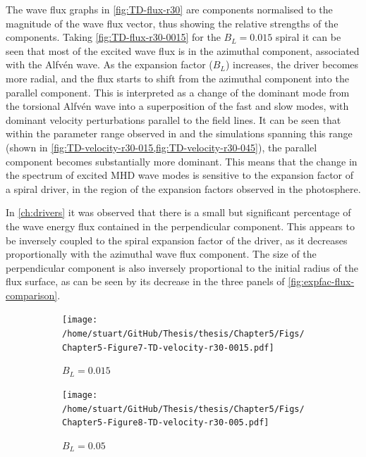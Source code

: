 \documentclass[a4paper,12pt,fourier,authoryear,custommargin]{Classes/PhDThesisPSnPDF}
\begin{document}
The wave flux graphs in \cref{fig:TD-flux-r30} are components normalised to the magnitude of the wave flux vector, thus showing the relative strengths of the components.
Taking \cref{fig:TD-flux-r30-0015} for the $B_L=0.015$ spiral it can be seen that most of the excited wave flux is in the azimuthal component, associated with the Alfv\'en wave.
As the expansion factor ($B_L$) increases, the driver becomes more radial, and the flux starts to shift from the azimuthal component into the parallel component.
This is interpreted as a change of the dominant mode from the torsional Alfv\'en wave into a superposition of the fast and slow modes, with dominant velocity perturbations parallel to the field lines.
It can be seen that within the parameter range observed in \cite{bonet2008} and the simulations spanning this range (shown in \cref{fig:TD-velocity-r30-015,fig:TD-velocity-r30-045}), the parallel component becomes substantially more dominant.
This means that the change in the spectrum of excited MHD wave modes is sensitive to the expansion factor of a spiral driver, in the region of the expansion factors observed in the photosphere.

In \cref{ch:drivers} it was observed that there is a small but significant percentage of the wave energy flux contained in the perpendicular component.
This appears to be inversely coupled to the spiral expansion factor of the driver, as it decreases proportionally with the azimuthal wave flux component.
The size of the perpendicular component is also inversely proportional to the initial radius of the flux surface, as can be seen by its decrease in the three panels of \cref{fig:expfac-flux-comparison}.



\begin{figure}
    \centering
    

    \begin{subfigure}[b]{0.9\columnwidth}
        \texttt{[image: /home/stuart/GitHub/Thesis/thesis/Chapter5/Figs/Chapter5-Figure7-TD-velocity-r30-0015.pdf]}
        \caption{$B_L = 0.015$}
        \label{fig:TD-velocity-r30-0015}
    \end{subfigure}

    \begin{subfigure}[b]{0.9\columnwidth}
        \texttt{[image: /home/stuart/GitHub/Thesis/thesis/Chapter5/Figs/Chapter5-Figure8-TD-velocity-r30-005.pdf]}
        \caption{$B_L = 0.05$}
        \label{fig:TD-velocity-r30-005}
    \end{subfigure}
    \caption{}
    \label{fig:}
\end{figure}
\end{document}
